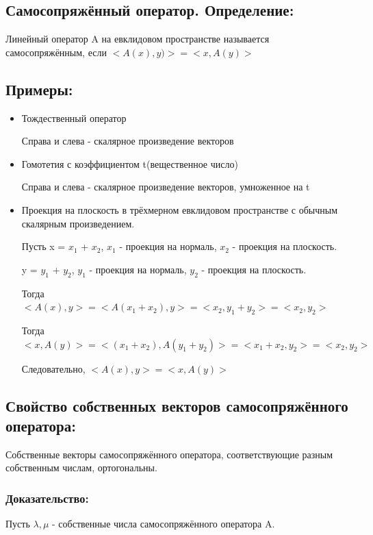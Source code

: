 \documentclass[12pt]{article}
\begin{document}
    \subsection{Самосопряжённый оператор. Определение:}
    Линейный оператор A на евклидовом пространстве называется самосопряжённым, если $<A(x), y)> = <x, A(y)>$

    \subsection{Примеры:}
    \begin{itemize}
        \item Тождественный оператор

              \quad Справа и слева - скалярное произведение векторов
        \item Гомотетия с коэффициентом t(вещественное число)

              \quad Справа и слева - скалярное произведение векторов, умноженное на t
        \item Проекция на плоскость в трёхмерном евклидовом пространстве с обычным скалярным произведением.

              \quad Пусть x = $x_1$ + $x_2$, $x_1$ - проекция на нормаль, $x_2$ - проекция на плоскость.

              \quad y = $y_1$ + $y_2$, $y_1$ - проекция на нормаль, $y_2$ - проекция на плоскость.

              \quad Тогда $<A(x), y> = <A(x_1 + x_2), y> = <x_2, y_1 + y_2> = <x_2, y_2>$

              \quad Тогда $<x, A(y)> = <(x_1 + x_2), A(y_1 + y_2)> = <x_1 + x_2, y_2> = <x_2, y_2>$

              \quad Следовательно, $<A(x), y> = <x, A(y)>$
    \end{itemize}

    \subsection{Свойство собственных векторов самосопряжённого оператора:}
    Собственные векторы самосопряжённого оператора, соответствующие разным собственным числам, ортогональны.

    \subsubsection{Доказательство:}

    Пусть $\lambda, \mu$ - собственные числа самосопряжённого оператора A.
\end{document}
